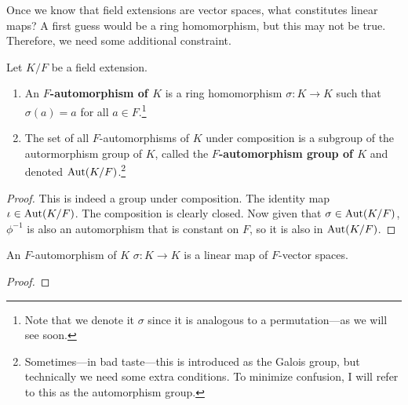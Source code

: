   Once we know that field extensions are vector spaces, what constitutes linear maps? A first guess would be a ring homomorphism, but this may not be true. Therefore, we need some additional constraint. 

  \begin{definition}
    Let $K/F$ be a field extension. 
    \begin{enumerate}
      \item An \textbf{$F$-automorphism of $K$} is a ring homomorphism $\sigma: K \to K$ such that $\sigma(a) = a$ for all $a \in F$.\footnote{Note that we denote it $\sigma$ since it is analogous to a permutation---as we will see soon.}
      \item The set of all $F$-automorphisms of $K$ under composition is a subgroup of the autormorphism group of $K$, called the \textbf{$F$-automorphism group of $K$} and denoted $\Aut(K/F)$.\footnote{Sometimes---in bad taste---this is introduced as the Galois group, but technically we need some extra conditions. To minimize confusion, I will refer to this as the automorphism group.}
    \end{enumerate}
  \end{definition}
  \begin{proof}
    This is indeed a group under composition. The identity map $\iota \in \Aut(K/F)$. The composition is clearly closed. Now given that $\sigma \in \Aut(K/F)$, $\phi^{-1}$ is also an automorphism that is constant on $F$, so it is also in $\Aut(K/F)$. 
  \end{proof}

  \begin{lemma}
    An $F$-automorphism of $K$ $\sigma: K \to K$ is a linear map of $F$-vector spaces. 
  \end{lemma}
  \begin{proof}
    
  \end{proof}


